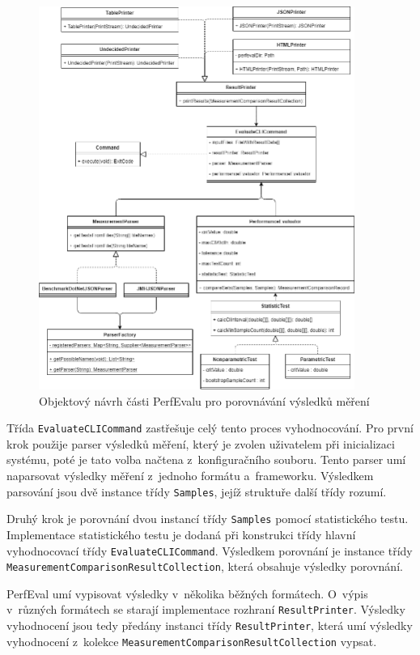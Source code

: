 \begin{figure}[!ht]
    \centering
    \includegraphics[width=0.92\textwidth]{../img/perfeval_evaluate.png}
    \caption{Objektový návrh části PerfEvalu pro porovnávání výsledků měření}
\end{figure}

Třída \lstinline|EvaluateCLICommand| zastřešuje celý tento proces vyhodnocování.
Pro první krok použije parser výsledků měření, který je zvolen uživatelem při inicializaci systému,
poté je tato volba načtena z~konfiguračního souboru. Tento parser umí naparsovat výsledky měření
z~jednoho formátu a~frameworku. Výsledkem parsování jsou dvě instance třídy \lstinline|Samples|,
jejíž struktuře další třídy rozumí.

Druhý krok je porovnání dvou instancí třídy \lstinline|Samples| pomocí statistického testu.
Implementace statistického testu je dodaná při konstrukci třídy hlavní vyhodnocovací třídy \lstinline|EvaluateCLICommand|.
Výsledkem porovnání je instance třídy \lstinline|MeasurementComparisonResultCollection|, která obsahuje výsledky porovnání.

PerfEval umí vypisovat výsledky v~několika běžných formátech. O~výpis v~různých formátech se starají implementace rozhraní
\lstinline|ResultPrinter|. Výsledky vyhodnocení jsou tedy předány instanci třídy \lstinline|ResultPrinter|, která
umí výsledky vyhodnocení z~kolekce \lstinline|MeasurementComparisonResultCollection| vypsat.

